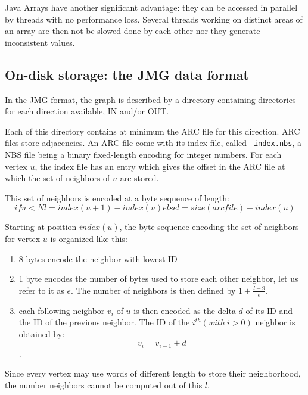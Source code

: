 \documentclass[11pt,a4paper]{article}
\begin{document}
Java Arrays have another significant advantage: they can be accessed in parallel by threads with no performance loss. Several threads working on distinct areas of an array are then not be slowed done by each other nor they generate inconsistent values.

\subsection{On-disk storage: the JMG data format}


In the JMG format, the graph is described by a directory containing directories for each direction available, IN and/or OUT.

Each of this directory contains at minimum the ARC file for this direction.
ARC files store adjacencies.  An ARC file come with its index file, called \texttt{-index.nbs}, a NBS file being a binary fixed-length encoding for integer numbers.
For each vertex $u$, the index file has an entry which gives the offset in the ARC file at which the set of neighbors of $u$ are stored.

This set of neighbors is encoded at a byte sequence of length:
$$if u < N l = index(u+1) - index(u) else l = size(arcfile) - index(u)$$


Starting at position $index(u)$, the byte sequence encoding the set of neighbors for vertex $u$ is organized like this:
\begin{enumerate}
\item 8 bytes encode the neighbor with lowest ID
\item 1 byte encodes the number of bytes used to store each other neighbor, let us refer to it as $e$. The number of neighbors is then defined by $1 + \frac{l - 9}{e}$.
\item each following neighbor $v_i$ of $u$ is then encoded as the delta $d$ of its ID and the ID of the previous neighbor.
The ID of the $i^{th} (with\ i > 0)$ neighbor is obtained by:
$$v_i = v_{i-1} + d$$.
\end{enumerate}
Since every vertex may use words of different length to store their neighborhood,  the number neighbors cannot be computed out of this $l$.
\end{document}
